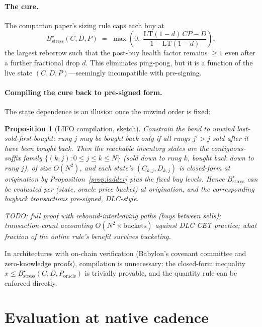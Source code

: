 \documentclass[12pt]{article}
\newtheorem{proposition}{Proposition}
\begin{document}
\paragraph{The cure.} The companion paper's sizing rule caps each buy at
\[
B^{\star}_{\text{stress}}(C,D,P) \;=\;
\max\!\left(0,\;
\frac{\mathrm{LT}(1-d)\,C P - D}{1-\mathrm{LT}(1-d)}\right),
\]
the largest reborrow such that the post-buy health factor remains $\ge 1$ even
after a further fractional drop $d$. This eliminates ping-pong, but it is a
function of the live state $(C,D,P)$---seemingly incompatible with
pre-signing.

\paragraph{Compiling the cure back to pre-signed form.} The state dependence
is an illusion once the unwind order is fixed:

\begin{proposition}[LIFO compilation, sketch]
\label{prop:lifo}
Constrain the band to unwind last-sold-first-bought: rung $j$ may be bought
back only if all rungs $j' > j$ sold after it have been bought back. Then the
reachable inventory states are the contiguous-suffix family
$\{(k,j): 0 \le j \le k \le N\}$ (sold down to rung $k$, bought back down to
rung $j$), of size $O(N^2)$, and each state's $(C_{k,j}, D_{k,j})$ is
closed-form at origination by Proposition~\ref{prop:ladder} plus the fixed
buy levels. Hence $B^{\star}_{\text{stress}}$ can be evaluated per (state,
oracle price bucket) at origination, and the corresponding buyback
transactions pre-signed, DLC-style.
\end{proposition}

\emph{TODO: full proof with rebound-interleaving paths (buys between sells);
transaction-count accounting $O(N^2 \times \text{buckets})$ against DLC CET
practice; what fraction of the online rule's benefit survives bucketing.}

In architectures with on-chain verification (Babylon's covenant committee and
zero-knowledge proofs), compilation is unnecessary: the closed-form inequality
$x \le B^{\star}_{\text{stress}}(C,D,P_{\text{oracle}})$ is trivially provable,
and the quantity rule can be enforced directly.

\section{Evaluation at native cadence}
\label{sec:eval}
\end{document}
